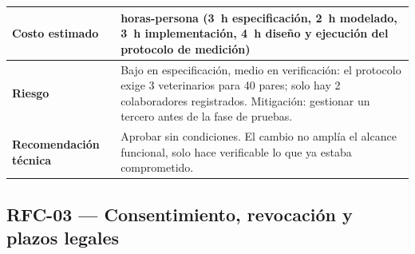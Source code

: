 \documentclass[journal,onecolumn]{IEEEtran}
\begin{document}
\begin{longtable}{
			|>{\raggedright\arraybackslash}p{3.8cm}
			|>{\raggedright\arraybackslash}p{9.7cm}|
		}
		\hline
		\textbf{Costo estimado} & 12 horas-persona (3~h especificación,
		2~h modelado, 3~h implementación, 4~h diseño y ejecución del
		protocolo de medición) \\
		\hline
		\textbf{Riesgo} & Bajo en especificación, medio en verificación: el
		protocolo exige 3 veterinarios para 40 pares; solo hay 2
		colaboradores registrados. Mitigación: gestionar un tercero antes
		de la fase de pruebas. \\
		\hline
		\textbf{Recomendación técnica} & Aprobar sin condiciones. El
		cambio no amplía el alcance funcional, solo hace verificable lo
		que ya estaba comprometido. \\
		\hline
	\end{longtable}
	
	\subsection{RFC-03 — Consentimiento, revocación y plazos legales}
	
\end{document}
